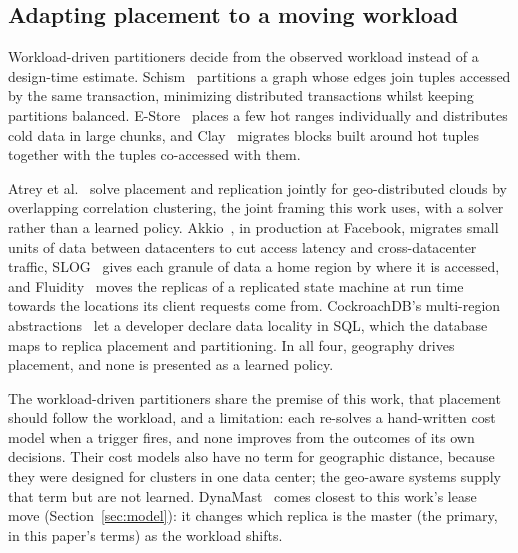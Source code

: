 \subsection{Adapting placement to a moving workload}

Workload-driven partitioners decide from the observed workload instead of a
design-time estimate. Schism~\cite{curino2010schism} partitions a graph whose
edges join tuples accessed by the same transaction, minimizing distributed
transactions whilst keeping partitions balanced. E-Store~\cite{taft2014estore} places
a few hot ranges individually and distributes cold data in large chunks, and
Clay~\cite{serafini2016clay} migrates blocks built around hot tuples together
with the tuples co-accessed with them.

Atrey et al.~\cite{atrey2019unifying} solve placement and replication jointly
for geo-distributed clouds by overlapping correlation clustering, the joint
framing this work uses, with a solver rather than a learned policy. Akkio~\cite{annamalai2018akkio}, in production at
Facebook, migrates small units of data between datacenters to cut access
latency and cross-datacenter traffic, SLOG~\cite{ren2019slog} gives each granule
of data a home region by where it is accessed, and
Fluidity~\cite{kostler2023fluidity} moves the replicas of a replicated state
machine at run time towards the locations its client requests come from.
CockroachDB's multi-region abstractions~\cite{vanbenschoten2022multiregion}
let a developer declare data locality in SQL, which the database maps to
replica placement and partitioning. In all four, geography drives placement,
and none is presented as a learned policy.

The workload-driven partitioners share the premise of this work, that placement should
follow the workload, and a limitation: each re-solves a hand-written cost model
when a trigger fires, and none improves from the outcomes of its own decisions.
Their cost models also have no term for geographic distance, because they were
designed for clusters in one data center; the geo-aware systems supply that
term but are not learned. DynaMast~\cite{abebe2020dynamast} comes closest to
this work's lease move (Section~\ref{sec:model}): it changes which replica is
the master (the primary, in this paper's terms) as the workload shifts.

